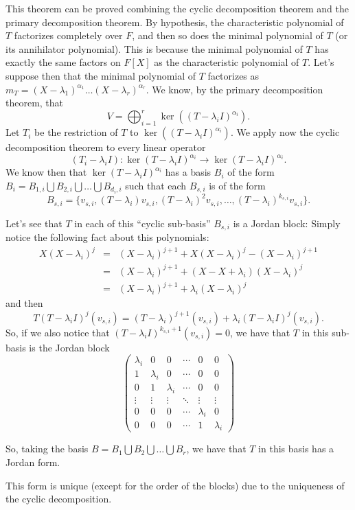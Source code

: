 \documentclass[12pt]{article}
\begin{document}
This theorem can be proved combining the cyclic decomposition theorem and the primary decomposition theorem.
By hypothesis, the characteristic polynomial of $T$ factorizes completely over $F$, and then so does the minimal polynomial of $T$ (or its annihilator polynomial). This is because the minimal polynomial of $T$ has exactly the same factors on $F[X]$ as the characteristic polynomial of $T$. Let's suppose then that the minimal polynomial of $T$ factorizes as $m_{T}=(X-\lambda_1)^{\alpha_1} \ldots (X-\lambda_r)^{\alpha_r}$.
We know, by the primary decomposition theorem, that 
$$V=\bigoplus_{i=1}^{r}\ker((T-\lambda_iI)^{\alpha_i}).$$
Let $T_{i}$ be the restriction of $T$ to $\ker((T-\lambda_iI)^{\alpha_{i}})$. We apply now the cyclic decomposition theorem to every linear operator $$(T_{i}-\lambda_iI) \colon \ker(T-\lambda_iI)^{\alpha_{i}}\to \ker(T-\lambda_iI)^{\alpha_{i}}.$$ We know then that $\ker(T-\lambda_iI)^{\alpha_i}$ has a basis $B_{i}$ of the form 
$B_{i}= B_{1,i} \bigcup B_{2,i} \bigcup \ldots \bigcup B_{d_i,i}$
such that each $B_{s,i}$ is of the form $$B_{s,i}=\{v_{s,i}, (T-\lambda_i)v_{s,i}, (T-\lambda_i)^{2}v_{s,i}, \ldots, 
(T-\lambda_i)^{k_{s,i}}v_{s,i}\}.$$

Let's see that $T$ in each of this ``cyclic sub-basis'' $B_{s,i}$ is a Jordan block: 
Simply notice the following fact about this polynomials:
\begin{eqnarray*}
X(X-\lambda_i)^{j} &=&
(X-\lambda_i)^{j+1}+X(X-\lambda_i)^{j}-(X-\lambda_i)^{j+1} \\
&=& (X-\lambda_i)^{j+1}+(X-X+\lambda_i)(X-\lambda_i)^{j} \\
&=& (X-\lambda_i)^{j+1}+\lambda_i(X-\lambda_i)^{j}
\end{eqnarray*}
and then $$T(T-\lambda_iI)^{j}(v_{s,i})=(T-\lambda_i)^{j+1}(v_{s,i})+\lambda_i(T-\lambda_iI)^{j}(v_{s,i}).$$ So, if we also notice that $(T-\lambda_iI)^{k_{s,i}+1}(v_{s,i})=0$, we have that $T$ in this sub-basis is the Jordan block
$$\begin{pmatrix}
\lambda_i & 0 & 0 & \cdots & 0 & 0\\
1 & \lambda_i & 0 & \cdots & 0 & 0\\
0 & 1 & \lambda_i & \cdots & 0 & 0\\
\vdots & \vdots & \vdots & \ddots & \vdots & \vdots \\
0 & 0 & 0 & \cdots & \lambda_i & 0\\
0 & 0 & 0 & \cdots & 1 & \lambda_{i}
\end{pmatrix}$$

So, taking the basis $B=B_{1} \bigcup B_{2} \bigcup \ldots \bigcup B_{r}$, we have that $T$ in this basis has a Jordan form.

This form is unique (except for the order of the blocks) due to the uniqueness of the cyclic decomposition.
\end{document}
